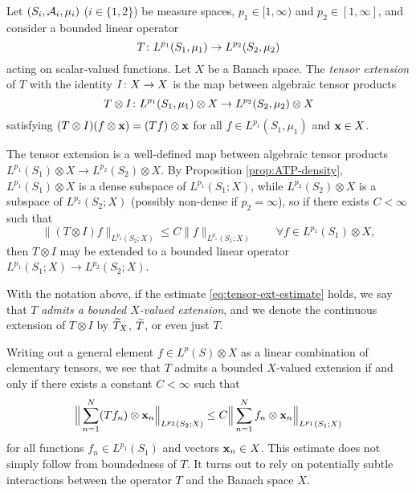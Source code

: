\begin{defn}\label{defn:tensor-exts}
  Let $(S_i,\mathcal{A}_i,\mu_i)$ ($i \in \{1,2\}$) be measure spaces, $p_1 \in [1,\infty)$ and $p_2 \in [1,\infty]$, and consider a bounded linear operator
  \begin{equation*}
    T \colon L^{p_1}(S_1,\mu_1) \rightarrow L^{p_2}(S_2,\mu_2)
  \end{equation*}
  acting on scalar-valued functions.
  Let $X$ be a Banach space.
  The \emph{tensor extension} of $T$ with the identity $I \colon X \rightarrow X$ is the map between algebraic tensor products
  \begin{equation*}
    T \otimes I \colon L^{p_1}(S_1,\mu_1) \otimes X \rightarrow L^{p_2}(S_2,\mu_2) \otimes X
  \end{equation*}
  satisfying $(T \otimes I)(f \otimes \mathbf{x}) = (Tf) \otimes \mathbf{x}$ for all $f \in L^{p_1}(S_1,\mu_1)$ and $\mathbf{x} \in X$.
\end{defn}

The tensor extension is a well-defined map between algebraic tensor products $L^{p_1}(S_1) \otimes X \to L^{p_2}(S_2) \otimes X$.
By Proposition \ref{prop:ATP-density}, $L^{p_1}(S_1) \otimes X$ is a dense subspace of $L^{p_1}(S_1;X)$, while $L^{p_2}(S_2) \otimes X$ is a subspace of $L^{p_2}(S_2;X)$ (possibly non-dense if $p_2 = \infty$), so if there exists $C < \infty$ such that
\begin{equation}\label{eq:tensor-ext-estimate}
  \|(T \otimes I)f\|_{L^{p_2}(S_2;X)} \leq C \|f\|_{L^{p_1}(S_1;X)} \qquad \forall f \in L^{p_1}(S_1) \otimes X,
\end{equation}
then $T \otimes I$ may be extended to a bounded linear operator $L^{p_1}(S_1;X) \to L^{p_2}(S_2;X)$.

\begin{defn}
  With the notation above, if the estimate \eqref{eq:tensor-ext-estimate} holds, we say that $T$ \emph{admits a bounded $X$-valued extension}, and we denote the continuous extension of $T \otimes I$ by $\widetilde{T}_X$, $\widetilde{T}$, or even just $T$.
\end{defn}


Writing out a general element $f \in L^p(S) \otimes X$ as a linear combination of elementary tensors, we see that $T$ admits a bounded $X$-valued extension if and only if there exists a constant $C < \infty$ such that
\begin{equation}\label{eq:tensor-ext-estimate-full}
  \Big\|\sum_{n=1}^N (Tf_n) \otimes \mathbf{x}_n\Big\|_{L^{p_2}(S_2;X)} \leq C \Big\|\sum_{n=1}^N f_n \otimes \mathbf{x}_n\Big\|_{L^{p_1}(S_1;X)}
\end{equation}
for all functions $f_n \in L^{p_1}(S_1)$ and vectors $\mathbf{x}_n \in X$.
This estimate does not simply follow from boundedness of $T$.
It turns out to rely on potentially subtle interactions between the operator $T$ and the Banach space $X$.

